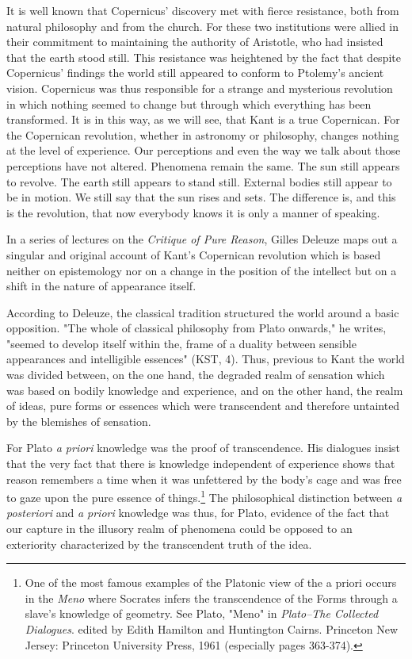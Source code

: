 It is well known that Copernicus' discovery met with fierce resistance, both from natural philosophy and from the church. For these two institutions were allied in their commitment to maintaining the authority of Aristotle, who had insisted that the earth stood still. This resistance was heightened by the fact that despite Copernicus' findings the world still appeared to conform to Ptolemy's ancient vision. Copernicus was thus responsible for a strange and mysterious revolution in which nothing seemed to change but through which everything has been transformed. It is in this way, as we will see, that Kant is a true Copernican. For the Copernican revolution, whether in astronomy or philosophy, changes nothing at the level of experience. Our perceptions and even the way we talk about those perceptions have not altered. Phenomena remain the same. The sun still appears to revolve. The earth still appears to stand still. External bodies still appear to be in motion. We still say that the sun rises and sets. The difference is, and this is the revolution, that now everybody knows it is only a manner of speaking.

In a series of lectures on the \textit{Critique of Pure Reason}, Gilles Deleuze maps out a singular and original account of Kant's Copernican revolution which is based neither on epistemology nor on a change in the position of the intellect but on a shift in the nature of appearance itself. 

According to Deleuze, the classical tradition structured the world around a basic opposition. "The whole of classical philosophy from Plato onwards," he writes, "seemed to develop itself within the, frame of a duality between sensible appearances and intelligible essences" (KST, 4). Thus, previous to Kant the world was divided between, on the one hand, the degraded realm of sensation which was based on bodily knowledge and experience, and on the other hand, the realm of ideas, pure forms or essences which were transcendent and therefore untainted by the blemishes of sensation. 

For Plato \textit{a priori} knowledge was the proof of transcendence. His dialogues insist that the very fact that there is knowledge independent of experience shows that reason remembers a time when it was unfettered by the body's cage and was free to gaze upon the pure essence of things.\footnote{One of the most famous examples of the Platonic view of the a priori occurs in the \textit{Meno} where Socrates infers the transcendence of the Forms through a slave's knowledge of geometry. See Plato, "Meno" in \textit{Plato--The Collected Dialogues}. edited by Edith Hamilton and Huntington Cairns. Princeton New Jersey: Princeton University Press, 1961 (especially pages 363-374).} The philosophical distinction between \textit{a posteriori} and \textit{a priori} knowledge was thus, for Plato, evidence of the fact that our capture in the illusory realm of phenomena could be opposed to an exteriority characterized by the transcendent truth of the idea.

